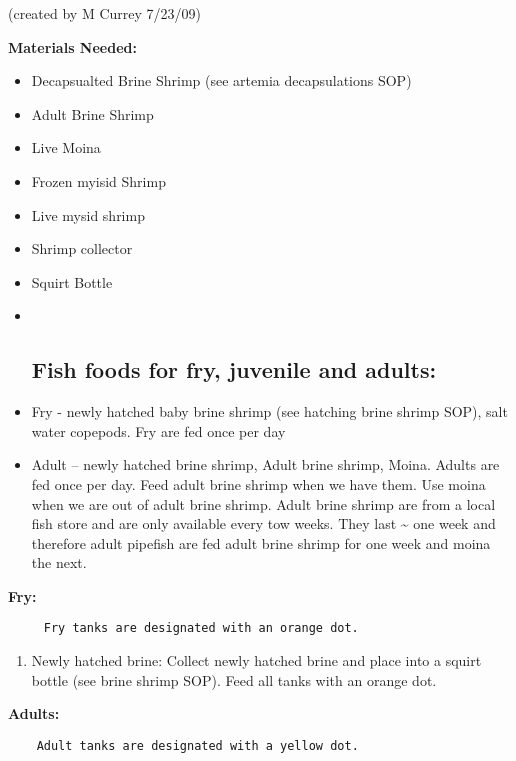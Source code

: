 \documentclass[
]{book}
\providecommand{\tightlist}{%
  \setlength{\itemsep}{0pt}\setlength{\parskip}{0pt}}
\begin{document}
(created by M Currey 7/23/09)

\textbf{Materials Needed:}

\begin{itemize}
\item
  Decapsualted Brine Shrimp (see artemia decapsulations SOP)
\item
  Adult Brine Shrimp
\item
  Live Moina
\item
  Frozen myisid Shrimp
\item
  Live mysid shrimp
\item
  Shrimp collector
\item
  Squirt Bottle
\item ~
  \hypertarget{fish-foods-for-fry-juvenile-and-adults}{%
  \subsection{Fish foods for fry, juvenile and adults:}\label{fish-foods-for-fry-juvenile-and-adults}}
\item
  Fry - newly hatched baby brine shrimp (see hatching brine shrimp SOP), salt water copepods. Fry are fed once per day
\item
  Adult -- newly hatched brine shrimp, Adult brine shrimp, Moina. Adults are fed once per day. Feed adult brine shrimp when we have them. Use moina when we are out of adult brine shrimp. Adult brine shrimp are from a local fish store and are only available every tow weeks. They last \textasciitilde{} one week and therefore adult pipefish are fed adult brine shrimp for one week and moina the next.
\end{itemize}

\textbf{Fry:}

\begin{verbatim}
     Fry tanks are designated with an orange dot. 
\end{verbatim}

\begin{enumerate}
\def\labelenumi{\arabic{enumi}.}
\tightlist
\item
  Newly hatched brine: Collect newly hatched brine and place into a squirt bottle (see brine shrimp SOP). Feed all tanks with an orange dot.
\end{enumerate}

\textbf{Adults:}

\begin{verbatim}
    Adult tanks are designated with a yellow dot. 
\end{verbatim}
\end{document}
